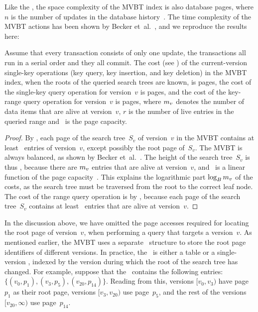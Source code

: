 Like the \TSBtree, the space complexity of the MVBT index is also
 database pages, where $n$ is the number of updates in the
database history~\cite{salzberg:1999:comparison,becker:1996:mvbt}. 
The time complexity of the MVBT actions has been shown by Becker
et~al.~\cite{becker:1993:optimal,becker:1996:mvbt}, and we reproduce the 
results here:

\thmskip
\begin{theorem}
\label{thm:mvbt-cost}
Assume that every transaction consists of only one update, the transactions
all run in a serial order and they all commit.
The cost (see ) of the current-version single-key
operations (key query, key insertion, and key deletion) in the MVBT index,
when the roots of the queried search trees are known, is
\OhT{\log_\capacity \entries{\comver}} pages,
the cost of the single-key query operation for version~$v$ is
 pages,
and the cost of the key-range query operation for version~$v$ is
 pages, where $m_{v}$
denotes the number of data items that are alive at version~$v$, $r$ is the
number of live entries in the queried range and \capacity\ is the page
capacity.
\end{theorem} 
\begin{proof}
By , each page of the search tree~$S_v$ of
version~$v$ in the MVBT contains at least \minlive\ entries of version~$v$,
except possibly the root page of~$S_v$.
The MVBT is always balanced, as shown by Becker
et~al.~\cite{becker:1993:optimal,becker:1996:mvbt}.
The height of the search tree~$S_v$ is thus ,
because there are $m_{v}$ entries that are alive at version~$v$, and
\minlive\ is a linear function of the page capacity~\capacity\@.
This explains the logarithmic part $\log_{B} m_{v}$ of the costs,
as the search tree must be traversed from the root to the correct leaf node.
The cost of the range query operation is  by , because each
page of the search tree~$S_v$ contains at least \minlive\ entries that are
alive at version~$v$.
\end{proof}
\thmskip

In the discussion above, we have omitted the page accesses required for
locating the root page of version~$v$, when performing a query that targets a
version~$v$.
As mentioned earlier, the MVBT uses a separate \rootstar\ structure to store
the root page identifiers of different versions.
In practice, the \rootstar\ is either a table or a single-version \Btree,
indexed by the version during which the root of the search tree has changed.
For example, suppose that the \rootstar\ contains the following entries:
$\{ (v_0, p_1), (v_3, p_5), (v_{20}, p_{14}) \}$.
Reading from this, versions $[v_0, v_3)$ have page~$p_1$ as
their root page, versions $[v_3, v_{20})$ use page~$p_5$, and the rest
of the versions $[v_{20}, \infty)$ use page~$p_{14}$.

